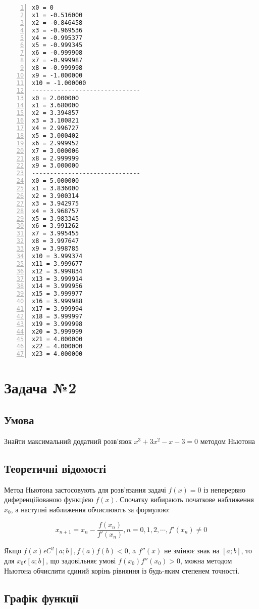 \documentclass[a4paper, 12pt]{article}
\begin{document}
\begin{Verbatim}[numbers=left,xleftmargin=20mm]
x0 = 0
x1 = -0.516000
x2 = -0.846458
x3 = -0.969536
x4 = -0.995377
x5 = -0.999345
x6 = -0.999908
x7 = -0.999987
x8 = -0.999998
x9 = -1.000000
x10 = -1.000000
------------------------------
x0 = 2.000000
x1 = 3.680000
x2 = 3.394857
x3 = 3.100821
x4 = 2.996727
x5 = 3.000402
x6 = 2.999952
x7 = 3.000006
x8 = 2.999999
x9 = 3.000000
------------------------------
x0 = 5.000000
x1 = 3.836000
x2 = 3.900314
x3 = 3.942975
x4 = 3.968757
x5 = 3.983345
x6 = 3.991262
x7 = 3.995455
x8 = 3.997647
x9 = 3.998785
x10 = 3.999374
x11 = 3.999677
x12 = 3.999834
x13 = 3.999914
x14 = 3.999956
x15 = 3.999977
x16 = 3.999988
x17 = 3.999994
x18 = 3.999997
x19 = 3.999998
x20 = 3.999999
x21 = 4.000000
x22 = 4.000000
x23 = 4.000000
\end{Verbatim}

\newpage
\section{Задача №2}

\subsection{Умова}

Знайти максимальний додатний розв’язок $ x^3 + 3x^2 - x - 3 = 0 $ методом Ньютона

\subsection{Теоретичні відомості}

Метод Ньютона застосовують для розв'язання задачі $f(x)=0$ із неперервно диференційованою функцією $f(x)$. Спочатку вибирають початкове наближення $x_0$, а наступні наближення обчислюють за формулою:

\[ x_{n+1} = x_n - \frac{f(x_n)}{f'(x_n)}, n = 0, 1, 2, \cdots, f'(x_n)\neq 0 \]

Якщо $ f(x) \epsilon C^2[a; b], f(a)f(b)<0$, a $f''(x)$ не змінює знак на $[a; b]$, то для $x_0 \epsilon [a; b]$, що задовільняє умові $f(x_0)f''(x_0)>0$, можна методом Ньютона обчислити єдиний корінь рівняння із будь-яким степенем точності.

\subsection{Графік функції}
\end{document}
